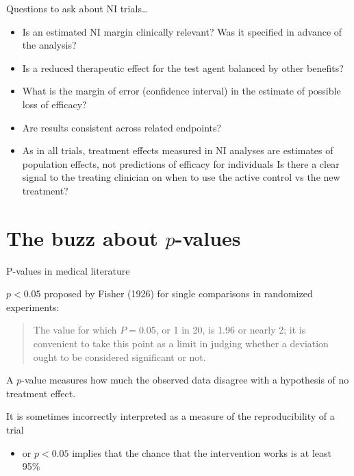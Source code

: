 \documentclass[ignorenonframetext,]{beamer}
\providecommand{\tightlist}{%
  \setlength{\itemsep}{0pt}\setlength{\parskip}{0pt}}
\begin{document}
\begin{frame}{Questions to ask about NI trials\ldots{}}
\protect\hypertarget{questions-to-ask-about-ni-trials-1}{}

\begin{itemize}
\item
  Is an estimated NI margin clinically relevant? Was it specified in
  advance of the analysis?
\item
  Is a reduced therapeutic effect for the test agent balanced by other
  benefits?
\item
  What is the margin of error (confidence interval) in the estimate of
  possible loss of efficacy?
\item
  Are results consistent across related endpoints?
\item
  As in all trials, treatment effects measured in NI analyses are
  estimates of population effects, not predictions of efficacy for
  individuals Is there a clear signal to the treating clinician on when
  to use the active control vs the new treatment?
\end{itemize}

\end{frame}

\hypertarget{the-buzz-about-p-values}{%
\section{\texorpdfstring{The buzz about
\(p\)-values}{The buzz about p-values}}\label{the-buzz-about-p-values}}

\begin{frame}{P-values in medical literature}
\protect\hypertarget{p-values-in-medical-literature}{}

\(p < 0.05\) proposed by Fisher (1926) for single comparisons in
randomized experiments:

\begin{quote}

The value for which $P = 0.05$, or 1 in 20, is 1.96 or nearly 2; it is convenient to take this point as a limit in judging whether a deviation ought to be considered significant or not. 

\end{quote}

A \(p\)-value measures how much the observed data disagree with a
hypothesis of no treatment effect.

It is sometimes incorrectly interpreted as a measure of the
reproducibility of a trial

\begin{itemize}
\tightlist
\item
  or \(p < 0.05\) implies that the chance that the intervention works is
  at least 95\%
\end{itemize}

\end{frame}
\end{document}
